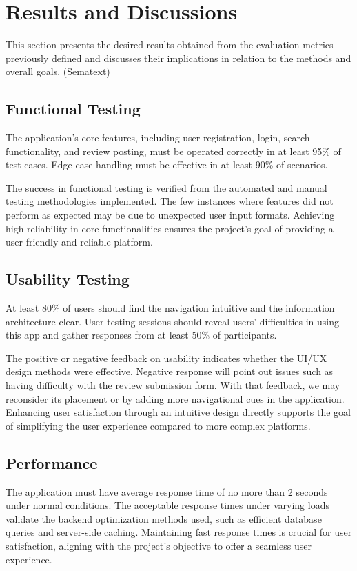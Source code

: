 \documentclass[10pt,twocolumn]{article}
\begin{document}
    \section{Results and Discussions}
    This section presents the desired results obtained from the evaluation metrics previously defined and discusses their implications in relation to the methods and overall goals. (Sematext)
    
    \subsection{Functional Testing}
    The application’s core features, including user registration, login, search functionality, and review posting, must be operated correctly in at least 95\% of test cases. Edge case handling must be effective in at least 90\% of scenarios.
    
    The success in functional testing is verified from the automated and manual testing methodologies implemented. The few instances where features did not perform as expected may be due to unexpected user input formats. Achieving high reliability in core functionalities ensures the project's goal of providing a user-friendly and reliable platform.
    
    \subsection{Usability Testing}
    At least 80\% of users should find the navigation intuitive and the information architecture clear. User testing sessions should reveal users’ difficulties in using this app and gather responses from at least 50\% of participants.
    
    The positive or negative feedback on usability indicates whether the UI/UX design methods were effective. Negative response will point out issues such as having difficulty with the review submission form. With that feedback, we may reconsider its placement or by adding more navigational cues in the application. Enhancing user satisfaction through an intuitive design directly supports the goal of simplifying the user experience compared to more complex platforms.

    \subsection{Performance}
    The application must have average response time of no more than 2 seconds under normal conditions. The acceptable response times under varying loads validate the backend optimization methods used, such as efficient database queries and server-side caching. Maintaining fast response times is crucial for user satisfaction, aligning with the project's objective to offer a seamless user experience.
\end{document}
